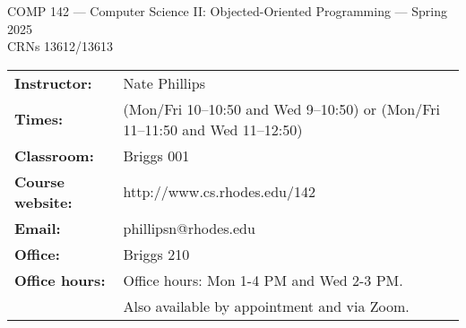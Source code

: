 \documentclass [letterpaper,11pt]{article}
\begin{document}
\begin{center}
\large COMP 142 --- Computer Science II: Objected-Oriented Programming --- Spring 2025
\\ \normalsize CRNs 13612/13613
\end{center}

\noindent\begin{tabular}{@{}ll}
\textbf{Instructor:} & Nate Phillips \\
\textbf{Times:} & (Mon/Fri 10--10:50 and Wed 9--10:50) or (Mon/Fri 11--11:50 and Wed 11--12:50) \\
\textbf{Classroom:} & Briggs 001 \\
\textbf{Course website:} & http://www.cs.rhodes.edu/142\\
\textbf{Email:} &phillipsn@rhodes.edu\\
\textbf{Office:} & Briggs 210\\
\textbf{Office hours:} & Office hours: Mon 1-4 PM and Wed 2-3 PM. \\&Also available by appointment and via Zoom.\\
\end{tabular}
\end{document}
